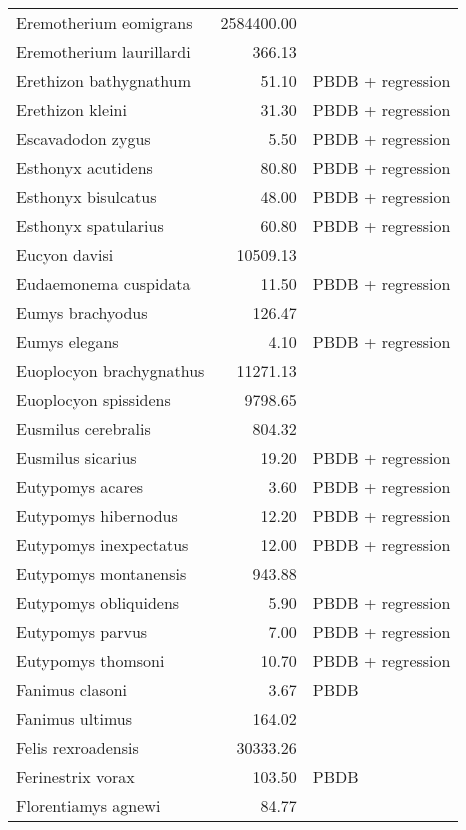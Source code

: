 \begin{table}[ht]
\begin{tabular}{lrl}
  Eremotherium eomigrans & 2584400.00 & \cite{McDonald1995} \\ 
  Eremotherium laurillardi & 366.13 & \cite{Smith2004} \\ 
  Erethizon bathygnathum & 51.10 & PBDB + regression \\ 
  Erethizon kleini & 31.30 & PBDB + regression \\ 
  Escavadodon zygus & 5.50 & PBDB + regression \\ 
  Esthonyx acutidens & 80.80 & PBDB + regression \\ 
  Esthonyx bisulcatus & 48.00 & PBDB + regression \\ 
  Esthonyx spatularius & 60.80 & PBDB + regression \\ 
  Eucyon davisi & 10509.13 & \cite{Tomiya2013} \\ 
  Eudaemonema cuspidata & 11.50 & PBDB + regression \\ 
  Eumys brachyodus & 126.47 & \cite{Tomiya2013} \\ 
  Eumys elegans & 4.10 & PBDB + regression \\ 
  Euoplocyon brachygnathus & 11271.13 & \cite{Tomiya2013} \\ 
  Euoplocyon spissidens & 9798.65 & \cite{Tomiya2013} \\ 
  Eusmilus cerebralis & 804.32 & \cite{Tomiya2013} \\ 
  Eusmilus sicarius & 19.20 & PBDB + regression \\ 
  Eutypomys acares & 3.60 & PBDB + regression \\ 
  Eutypomys hibernodus & 12.20 & PBDB + regression \\ 
  Eutypomys inexpectatus & 12.00 & PBDB + regression \\ 
  Eutypomys montanensis & 943.88 & \cite{Tomiya2013} \\ 
  Eutypomys obliquidens & 5.90 & PBDB + regression \\ 
  Eutypomys parvus & 7.00 & PBDB + regression \\ 
  Eutypomys thomsoni & 10.70 & PBDB + regression \\ 
  Fanimus clasoni & 3.67 & PBDB \\ 
  Fanimus ultimus & 164.02 & \cite{Tomiya2013} \\ 
  Felis rexroadensis & 30333.26 & \cite{Tomiya2013} \\ 
  Ferinestrix vorax & 103.50 & PBDB \\ 
  Florentiamys agnewi & 84.77 & \cite{Tomiya2013} \\ 

\end{tabular}
\end{table}

